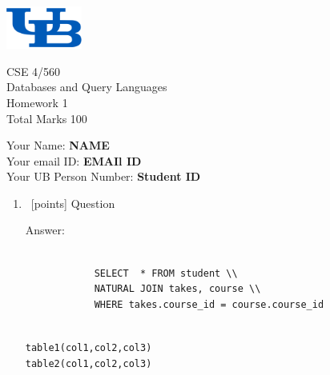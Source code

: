 \documentclass[12 pts]{article}
\author{}
\date{}
\begin{document}
    \voffset-2.5cm
    \parbox{3cm}{\includegraphics [width=25mm,scale=0.3]{ub_logo.png} }
    \parbox{8cm}{{\Large
        {CSE 4/560}\\
        {Databases and Query Languages}\\
        {Homework 1}\\
        {Total Marks 100}\\
        }
    }
    
    \vspace{1cm}
    
    \parbox{8cm}{
        {Your Name: {\bf NAME} }   \\
        {Your email ID: {\bf EMAIl ID} }   \\
        {Your UB Person Number: {\bf Student ID} }   \\
    }
    
    
    \begin{enumerate}[1.]
    
        \item ~[points] Question
        
        Answer: 
        
        \begin{verbatim}
            
            SELECT  * FROM student \\
            NATURAL JOIN takes, course \\
            WHERE takes.course_id = course.course_id
            
        \end{verbatim}
      
        \begin{alltt}
             table1 (col1, col2, col3)
             table2 (col1, col2, col3)
        \end{alltt}
        
        
    \end{enumerate}
\end{document}

